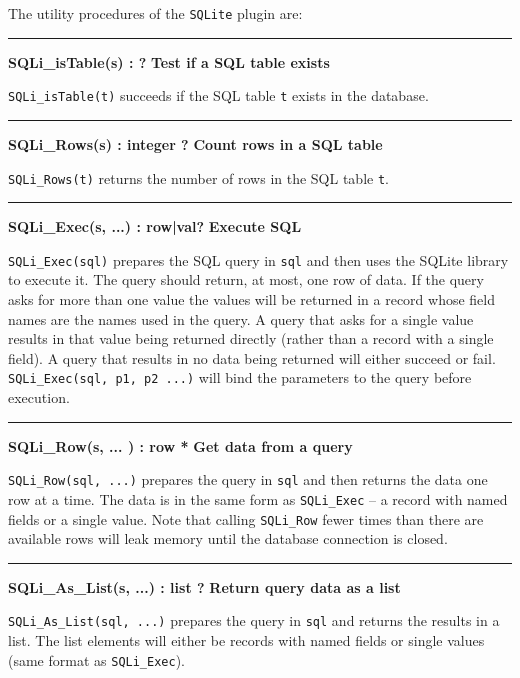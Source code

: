 The utility procedures of the \texttt{SQLite} plugin are:
\bigskip\hrule\vspace{0.1cm}
\noindent
{\bf SQLi\_isTable(s) :  ? } \hfill {\bf Test if a SQL table exists}
    
\noindent
\texttt{SQLi\_isTable(t)} succeeds if the SQL table \texttt{t} exists in the database.

\bigskip\hrule\vspace{0.1cm}
\noindent
{\bf SQLi\_Rows(s) : integer ? } \hfill {\bf Count rows in a SQL table}
    
\noindent
\texttt{SQLi\_Rows(t)} returns the number of rows in the SQL table \texttt{t}.

\bigskip\hrule\vspace{0.1cm}
\noindent
{\bf SQLi\_Exec(s, ...) : row|val? } \hfill {\bf Execute SQL}

\noindent
\texttt{SQLi\_Exec(sql)} prepares the SQL query in \texttt{sql} and then uses
the SQLite library to execute it. The query should return, at most, one row of
data.  If the query asks for more than one value the values will be returned in
a record whose field names are the names used in the query. A query that asks for a
single value results in that value being returned directly (rather than a record
with a single field). A query that results in no data being returned will either
succeed or fail.  \texttt{SQLi\_Exec(sql, p1, p2 ...)}  will bind the parameters
to the query before execution.

\bigskip\hrule\vspace{0.1cm}
\noindent
{\bf SQLi\_Row(s, ... ) : row * } \hfill {\bf Get data from a query}

\noindent
\texttt{SQLi\_Row(sql, ...)} prepares the query in \texttt{sql} and then returns
the data one row at a time. The data is in the same form as \texttt{SQLi\_Exec} -- a
record with named fields or a single value.  Note that calling \texttt{SQLi\_Row}
fewer times than there are available rows will leak memory until the database
connection is closed.

\bigskip\hrule\vspace{0.1cm}
\noindent
{\bf SQLi\_As\_List(s, ...) : list ? } \hfill {\bf Return query data as a list}

\noindent
\texttt{SQLi\_As\_List(sql, ...)}  prepares the query in \texttt{sql} and returns
the results in a list. The list elements will either be records with named
fields or single values (same format as \texttt{SQLi\_Exec}).

